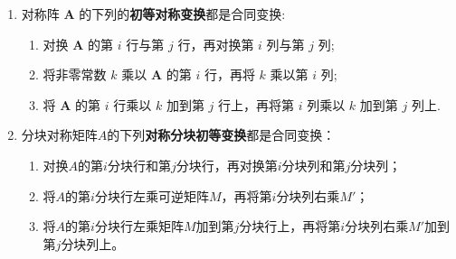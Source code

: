 \documentclass[../../main.tex]{subfiles}%
\begin{document}
\begin{lemma}[初等合同变换]\label{lemma:初等合同变换}
\begin{enumerate}
\item 对称阵 $\boldsymbol{A}$ 的下列的\textbf{初等对称变换}都是合同变换:
\begin{enumerate}[(1)]
\item 对换 $\boldsymbol{A}$ 的第 $i$ 行与第 $j$ 行，再对换第 $i$ 列与第 $j$ 列;
\item 将非零常数 $k$ 乘以 $\boldsymbol{A}$ 的第 $i$ 行，再将 $k$ 乘以第 $i$ 列;
\item 将 $\boldsymbol{A}$ 的第 $i$ 行乘以 $k$ 加到第 $j$ 行上，再将第 $i$ 列乘以 $k$ 加到第 $j$ 列上.
\end{enumerate}

\item 分块对称矩阵\(A\)的下列\textbf{对称分块初等变换}都是合同变换：
\begin{enumerate}[(1)]
\item 对换\(A\)的第\(i\)分块行和第\(j\)分块行，再对换第\(i\)分块列和第\(j\)分块列；
\item 将\(A\)的第\(i\)分块行左乘可逆矩阵\(M\)，再将第\(i\)分块列右乘\(M'\)；
\item 将\(A\)的第\(i\)分块行左乘矩阵\(M\)加到第\(j\)分块行上，再将第\(i\)分块列右乘\(M'\)加到第\(j\)分块列上。
\end{enumerate}
\end{enumerate}
\end{lemma}
\end{document}
